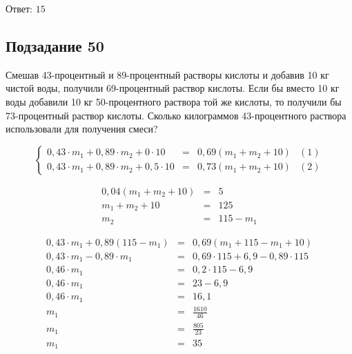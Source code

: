 Ответ: $15$

\subsection*{Подзадание 50}

Смешав 43-процентный и 89-процентный растворы кислоты и добавив 10 кг чистой воды, получили 69-процентный раствор кислоты. Если бы вместо 10 кг воды добавили 10 кг 50-процентного раствора той же кислоты, то получили бы 73-процентный раствор кислоты. Сколько килограммов 43-процентного раствора использовали для получения смеси?

\begin{equation*}
    \left\{
    \begin{array}{lclr}
        0,43 \cdot m_1 + 0,89 \cdot m_2 + 0 \cdot 10   & = & 0,69 (m_1 + m_2 + 10) & (1) \\
        0,43 \cdot m_1 + 0,89 \cdot m_2 + 0,5 \cdot 10 & = & 0,73 (m_1 + m_2 + 10) & (2)
    \end{array}
    \right.
\end{equation*}

\begin{equation*}
    \begin{array}{rcl}
        0,04(m_1 + m_2 + 10) & = & 5         \\
        m_1 + m_2 + 10       & = & 125       \\
        m_2                  & = & 115 - m_1
    \end{array}
\end{equation*}

\begin{equation*}
    \begin{array}{rcl}
        0,43 \cdot m_1  + 0,89 (115 - m_1) & = & 0,69 (m_1 + 115 - m_1 + 10)           \\
        0,43 \cdot m_1 - 0,89 \cdot m_1    & = & 0,69 \cdot 115 + 6,9 - 0,89 \cdot 115 \\
        0,46 \cdot m_1                     & = & 0,2 \cdot 115 - 6,9                   \\
        0,46 \cdot m_1                     & = & 23 - 6,9                              \\
        0,46 \cdot m_1                     & = & 16,1                                  \\
        m_1                                & = & \frac{1610}{46}                       \\
        m_1                                & = & \frac{805}{23}                        \\
        m_1                                & = & 35                                    \\
    \end{array}
\end{equation*}

